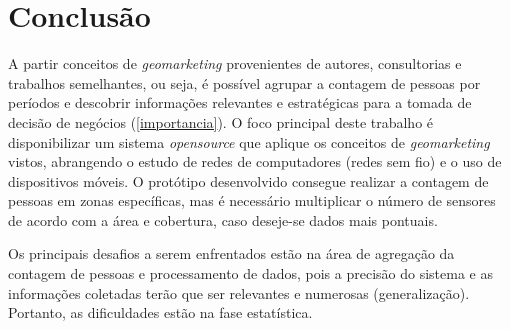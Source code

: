 \chapter{Conclusão}
\label{conclusao}

A partir conceitos de \emph{geomarketing} provenientes
de autores, consultorias e trabalhos semelhantes, ou seja, é
possível agrupar a contagem de pessoas por períodos e descobrir informações relevantes e estratégicas
para a tomada de decisão de negócios (\autoref{importancia}). O foco principal deste trabalho
é disponibilizar um sistema
\emph{opensource} que aplique os conceitos de \emph{geomarketing} vistos, abrangendo o
estudo de redes de computadores (redes sem fio) e o uso de dispositivos móveis. O protótipo desenvolvido
consegue realizar a contagem de pessoas em zonas específicas,
mas é necessário multiplicar o número de sensores de acordo
com a área e cobertura, caso deseje-se dados mais pontuais.

Os principais desafios a serem enfrentados estão na área de agregação da
contagem de pessoas e processamento de dados, pois a precisão do sistema e as
informações coletadas terão que ser relevantes e numerosas (generalização).
Portanto, as dificuldades estão na fase estatística.
